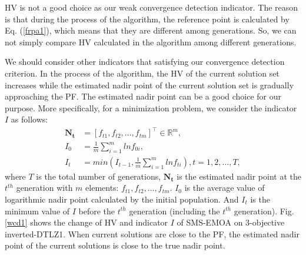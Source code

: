 \documentclass[conference]{IEEEtran}
\begin{document}
HV is not a good choice as our weak convergence detection indicator. 
The reason is that during the process of the algorithm, the reference point is calculated by Eq. (\ref{frpa1}), 
which means that they are different among generations. 
So, we can not simply compare HV calculated in the algorithm among different generations. 

We should consider other indicators that satisfying our convergence detection criterion. 
In the process of the algorithm, the HV of the current solution set increases 
while the estimated nadir point of the current solution set is gradually approaching the PF. 
The estimated nadir point can be a good choice for our purpose. 
More specifically,
for a minimization problem, we consider the indicator $I$ as follows:
\begin{equation}\begin{aligned}\label{ewcd1}
  \boldsymbol{N_{t}} &= [f_{t1},f_{t2},\dots,f_{tm}]^\top \in \mathbb{R}^m ,\\
  I_{0} &= \frac{1}{m} \sum_{i=1}^{m}lnf_{0i},\\
  I_{t} &= min(I_{t-1},\frac{1}{m} \sum_{i=1}^{m}lnf_{ti}),
  t = 1,2,\dots,T,
\end{aligned}
\end{equation}
where $T$ is the total number of generations, 
$\boldsymbol{N_{t}}$ is the estimated nadir point at the $t^{th}$ generation with $m$ elements: $f_{t1},f_{t2},\dots,f_{tm}$. 
$I_0$ is the average value of logarithmic nadir point calculated by the initial population.
And $I_t$ is the minimum value of $I$ before the $t^{th}$ generation (including the $t^{th}$ generation). 
Fig. \ref{wcd1} shows the change of HV and indicator $I$ of SMS-EMOA on 3-objective inverted-DTLZ1.
When current solutions are close to the PF, the estimated nadir point of the current solutions is close 
to the true nadir point. 
\end{document}
